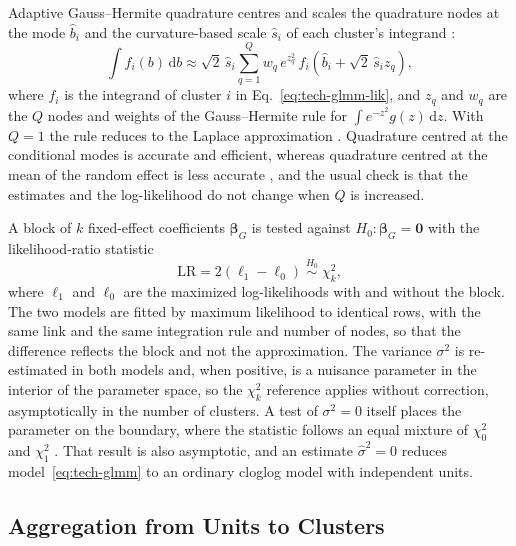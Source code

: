 Adaptive Gauss--Hermite quadrature centres and scales the quadrature nodes at the mode $\hat{b}_i$ and the curvature-based scale $\hat{s}_i$ of each cluster's integrand \cite{liu1994gausshermite}:
\begin{equation}
  \int f_i(b)\,\mathrm{d}b \approx \sqrt{2}\,\hat{s}_i \sum_{q=1}^{Q} w_q\, e^{z_q^2}\, f_i\!\left(\hat{b}_i + \sqrt{2}\,\hat{s}_i z_q\right),
  \label{eq:tech-aghq}
\end{equation}
where $f_i$ is the integrand of cluster $i$ in Eq.~\eqref{eq:tech-glmm-lik}, and $z_q$ and $w_q$ are the $Q$ nodes and weights of the Gauss--Hermite rule for $\int e^{-z^2} g(z)\,\mathrm{d}z$.
With $Q = 1$ the rule reduces to the Laplace approximation \cite{statacorp2025mecloglog}.
Quadrature centred at the conditional modes is accurate and efficient, whereas quadrature centred at the mean of the random effect is less accurate \cite{pinheiro1995approximations}, %
and the usual check is that the estimates and the log-likelihood do not change when $Q$ is increased.

A block of $k$ fixed-effect coefficients $\boldsymbol{\beta}_G$ is tested against $H_0\colon \boldsymbol{\beta}_G = \mathbf{0}$ with the likelihood-ratio statistic
\begin{equation}
  \mathrm{LR} = 2\left(\ell_1 - \ell_0\right) \;\overset{H_0}{\sim}\; \chi^2_k ,
  \label{eq:tech-lr}
\end{equation}
where $\ell_1$ and $\ell_0$ are the maximized log-likelihoods with and without the block.
The two models are fitted by maximum likelihood to identical rows, with the same link and the same integration rule and number of nodes, so that the difference reflects the block and not the approximation.
The variance $\sigma^2$ is re-estimated in both models and, when positive, is a nuisance parameter in the interior of the parameter space, so the $\chi^2_k$ reference applies without correction, asymptotically in the number of clusters.
A test of $\sigma^2 = 0$ itself places the parameter on the boundary, where the statistic follows an equal mixture of $\chi^2_0$ and $\chi^2_1$ \cite{self1987asymptotic}.
That result is also asymptotic, and an estimate $\hat{\sigma}^2 = 0$ reduces model~\eqref{eq:tech-glmm} to an ordinary cloglog model with independent units.

\subsection{Aggregation from Units to Clusters}
\label{sec:tech-aggregation}

